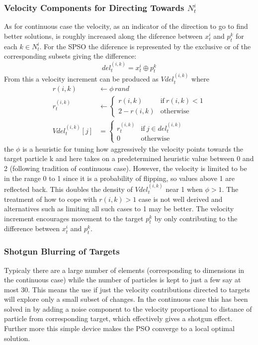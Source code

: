 \documentclass[a4paper,oneside,english]{article}
\numberwithin{equation}{section}
\numberwithin{figure}{section}
\begin{document}
\subsubsection{Velocity Components for Directing Towards $N_t^i$}
As for continuous case the velocity, as an indicator of the direction to go to find better solutions, is roughly increased along the diference between $x_t^i$ and $p_t^k$ for each $k \in  N_t^i$. For the SPSO the diference is represented by the exclusive or of the corresponding subsets giving the difference:
$$del_t^{(i,k)}= x_t^i\oplus p_t^k$$ 
From this a velocity increment can be produced  as $Vdel_t^{(i,k)}$ where  
\begin{align}
\label{randPhi} r(i,k)&\leftarrow\phi\, rand\\
\label{limitPhi}r_t^{(i,k)}&\leftarrow\begin{cases}
r(i,k)& \mathrm{if}\:r(i,k)<1\\
2-r(i,k)& \mathrm{otherwise}
\end{cases}\\
\label{targVel}Vdel_t^{(i,k)}[j]&=\begin{cases}
r_t^{(i,k)}& \mathrm{if}\: j \in del_t^{(i,k)}\\
0 &\mathrm{otherwise}
\end{cases}
\end{align}
the $\phi$ is a heuristic for tuning how aggressively the velocity points towards the  target particle k and here takes on a predetermined heuristic value between 0 and 2 (following tradition of continuous case). However, the velocity is limited to be in the range 0 to 1 since it is a probability of flipping, so values above 1 are reflected back. This doubles the density of $Vdel_t^{(i,k)}$ near 1 when  $\phi > 1$. The treatment of how to cope with $r(i,k) >1$ case is not well derived and  alternatives such as limiting all such cases to 1 may be better. The velocity increment encourages movement to the target $p_t^k$ by only contributing to the difference between $x_t^i$ and  $p_t^k$.
\subsubsection{Shotgun Blurring of Targets }
Typicaly there are a large number of elements (corresponding to dimensions in the continuous case) while the number of particles  is kept to just a few say at most 30. This means the use if just the velocity contributions directed to targets will explore only a small subset of changes. In the continuous case this has been solved in \cite{LcRiPSO} by adding a noise component to the velocity proportional to distance of particle from corresponding target, which effectively gives a shotgun effect. Further more this simple device makes the PSO converge to a local optimal solution.
\end{document}
